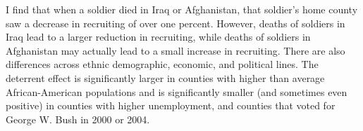\documentclass[12pt] {article}
\begin{document}
I find that when a soldier died in Iraq or Afghanistan, that soldier's
home county saw a decrease in recruiting of over one percent. %
However, deaths of soldiers in Iraq lead to a larger reduction in recruiting, while deaths of soldiers in Afghanistan may actually lead to a small increase in recruiting. There are also differences across ethnic demographic, economic, and political lines. The deterrent effect is significantly larger in counties with higher than average African-American populations and is significantly smaller (and sometimes even positive) in counties with higher unemployment, and counties that voted for George W. Bush in 2000 or 2004. 




\end{document}
